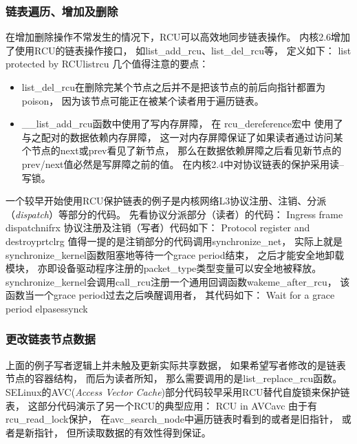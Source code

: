\documentclass[11pt]{article}
\begin{document}
\subsubsection{链表遍历、增加及删除}
在增加删除操作不常发生的情况下，RCU可以高效地同步链表操作。
内核2.6增加了使用RCU的链表操作接口，
如list\_add\_rcu、list\_del\_rcu等，
定义如下：
              {list protected by RCU}{listrcu}
几个值得注意的要点：
\begin{itemize}
\item list\_del\_rcu在删除完某个节点之后并不是把该节点的前后向指针都置为poison，
  因为该节点可能正在被某个读者用于遍历链表。
\item \_\_list\_add\_rcu函数中使用了写内存屏障，
  在%
  rcu\_dereference宏中%
  使用了与之配对的数据依赖内存屏障，
  这一对内存屏障保证了如果读者通过访问某个节点的next或prev看见了新节点，
  那么在数据依赖屏障之后看见新节点的prev/next值必然是写屏障之前的值。
  在内核2.4中对协议链表的保护采用读--写锁。
\end{itemize}

一个较早开始使用RCU保护链表的例子是内核网络L3协议注册、注销、分派%
（{\em dispatch}）等部分的代码。
先看协议分派部分（读者）的代码：
              {Ingress frame dispatch}{nifrx}
协议注册及注销（写者）代码如下：
              {Protocol register and destroy}{prtclrg}
值得一提的是注销部分的代码调用synchronize\_net，
实际上就是synchronize\_kernel函数阻塞地等待一个grace period结束，
之后才能安全地卸载模块，
亦即设备驱动程序注册的packet\_type类型变量可以安全地被释放。
synchronize\_kernel会调用call\_rcu注册一个通用回调函数wakeme\_after\_rcu，
该函数当一个grace period过去之后唤醒调用者，
其代码如下：
              {Wait for a grace period elpases}{synck}

\subsubsection{更改链表节点数据}
上面的例子写者逻辑上并未触及更新实际共享数据，
如果希望写者修改的是链表节点的容器结构，
而后为读者所知，
那么需要调用的是list\_replace\_rcu函数。
SELinux的AVC({\em Access Vector Cache})部分代码较早采用RCU替代自旋锁来保护链表，
这部分代码演示了另一个RCU的典型应用：
              {RCU in AVC}{avc}
由于有rcu\_read\_lock保护，
在avc\_search\_node中遍历链表时看到的或者是旧指针，
或者是新指针，
但所读取数据的有效性得到保证。
\end{document}
